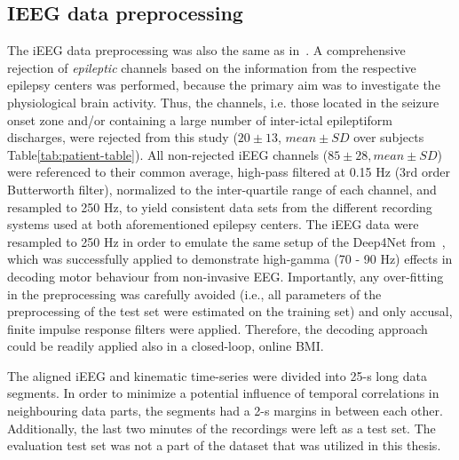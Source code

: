 \subsection{IEEG data preprocessing}\label{subsec:ieeg-data-preprocessing}
The iEEG data preprocessing was also the same as in~\cite{Hammer-2021}.
A comprehensive rejection of \textit{epileptic} channels based on the information from the respective epilepsy centers was performed, because the primary aim was to investigate the physiological brain activity.
Thus, the channels, i.e. those located in the seizure onset zone and/or containing a large number of inter-ictal epileptiform discharges, were rejected from this study ($20 \pm 13$, $mean \pm SD$ over subjects Table\ref{tab:patient-table}).
All non-rejected iEEG channels ($85 \pm 28, mean \pm SD$) were referenced to their common average, high-pass filtered at 0.15 Hz (3rd order Butterworth filter), normalized to the inter-quartile range of each channel, and resampled to 250 Hz, to yield consistent data sets from the different recording systems used at both aforementioned epilepsy centers.
The iEEG data were resampled to 250 Hz in order to emulate the same setup of the Deep4Net from~\cite{schirrmeister-deep-2017}, which was successfully applied to demonstrate high-gamma (70 - 90 Hz) effects in decoding motor behaviour from non-invasive EEG. Importantly, any over-fitting in the preprocessing was carefully avoided (i.e., all parameters of the preprocessing of the test set were estimated on the training set) and only accusal, finite impulse response filters were applied.
Therefore, the decoding approach could be readily applied also in a closed-loop, online BMI.

The aligned iEEG and kinematic time-series were divided into 25-s long data segments.
In order to minimize a potential influence of temporal correlations in neighbouring data parts, the segments had a 2-s margins in between each other. Additionally, the last two minutes of the recordings were left as a test set. The evaluation test set was not a part of the dataset that was utilized in this thesis.

